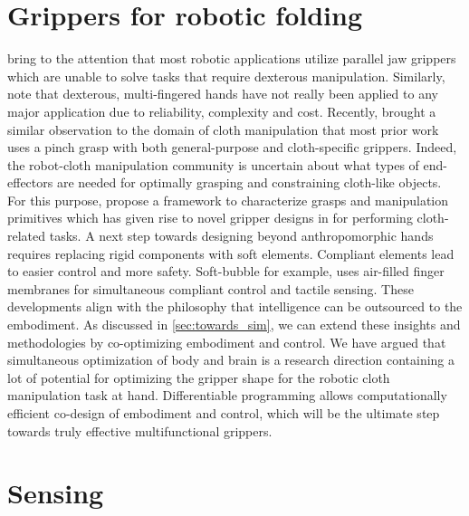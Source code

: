 \documentclass[\home/main.tex]{subfiles}
\begin{document}
\section{Grippers for robotic folding}
\Textcite{Billard2019} bring to the attention that most robotic applications utilize parallel jaw grippers which are unable to solve tasks that require dexterous manipulation.
Similarly, \textcite{Siciliano2008} note that dexterous, multi-fingered hands have not really been applied to any major application due to reliability, complexity and cost. Recently, \textcite{Borras2020} brought a similar observation to the domain of cloth manipulation that most prior work uses a pinch grasp with both general-purpose and cloth-specific grippers. Indeed, the robot-cloth manipulation community is uncertain about what types of end-effectors are needed for optimally grasping and constraining cloth-like objects. For this purpose, \citeauthor{Borras2020} propose a framework to characterize grasps and manipulation primitives which has given rise to novel gripper designs in \autocite{Donaire2020} for performing cloth-related tasks. 
A next step towards designing beyond anthropomorphic hands requires replacing rigid components with soft elements. Compliant elements lead to easier control and more safety. Soft-bubble \autocite{Naveen2020soft} for example, uses air-filled finger membranes for simultaneous compliant control and tactile sensing.
These developments align with the philosophy that intelligence can be outsourced to the embodiment.
As discussed in \cref{sec:towards_sim}, we can extend these insights and methodologies by co-optimizing embodiment and control. We have argued that simultaneous optimization of body and brain is a research direction containing a lot of potential for optimizing the gripper shape for the robotic cloth manipulation task at hand. Differentiable programming allows computationally efficient co-design of embodiment and control, which will be the ultimate step towards truly effective multifunctional grippers.



\section{Sensing}
\end{document}
